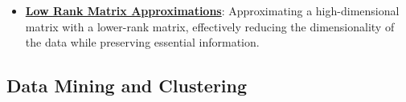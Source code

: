 \documentclass{article}%
\begin{document}
\begin{itemize}[leftmargin=*]
\item \href{https://purdue.brightspace.com/d2l/common/assets/pdfjs-d2l-dist/1.0.14-legacy/web/viewer.html?file=\%2Fcontent\%2Fenforced\%2F1095467-wl.202510.CS.24300.001\%2F11L2-svd-pca-recommender.pdf\%3Fou\%3D1095467\&lang=en-us\&container=d2l-fileviewer-rendered-pdf\&fullscreen=d2l-fileviewer-rendered-pdf-dialog\&height=667#page=9}{\textbf{Low Rank Matrix Approximations}}: Approximating a high-dimensional matrix with a lower-rank matrix, effectively reducing the dimensionality of the data while preserving essential information.%
\end{itemize}

%
\subsection{Data Mining and Clustering}%
\label{subsec:DataMiningandClustering}%
\end{document}
